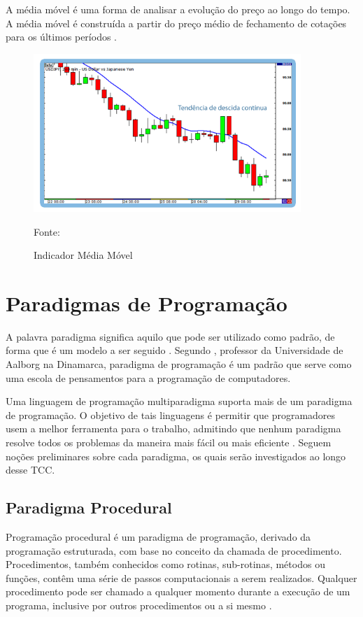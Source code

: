 A média móvel é uma forma de analisar a evolução do preço ao longo do tempo. A média móvel é construída a partir do preço médio de fechamento de cotações para os últimos períodos \cite{investforex}.

\begin{figure}[htp]
\centering
\includegraphics[width=0.9\textwidth]{figuras/mediamovel}
\caption{Indicador Média Móvel}{Fonte: } 
\label{mediamovel}
\end{figure}

\section{Paradigmas de Programação}

A palavra paradigma significa aquilo que pode ser utilizado como padrão, de forma que é um modelo a ser seguido \cite{ferreira1986}. Segundo , professor da Universidade de Aalborg na Dinamarca, paradigma de programação é um padrão que serve como uma escola de pensamentos para a programação de computadores.

Uma linguagem de programação multiparadigma suporta mais de um paradigma de programação. O objetivo de tais linguagens é permitir que programadores usem a melhor ferramenta para o trabalho, admitindo que nenhum paradigma  resolve todos os problemas da maneira mais fácil ou mais eficiente \cite[pág.~21]{paquet2010}. Seguem noções preliminares sobre cada paradigma, os quais serão investigados ao longo desse TCC.

\subsection{Paradigma Procedural}

Programação procedural é um paradigma de programação, derivado da programação estruturada, com base no conceito da chamada de procedimento. Procedimentos, também conhecidos como rotinas, sub-rotinas, métodos ou funções, contêm uma série de passos computacionais a serem realizados. Qualquer procedimento pode ser chamado a qualquer momento durante a execução de um programa, inclusive por outros procedimentos ou a si mesmo \cite[pág.~22]{paquet2010}.

